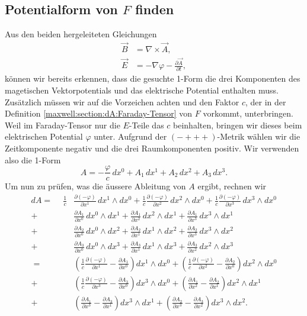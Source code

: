 \subsection{Potentialform von $F$ finden}
Aus den beiden hergeleiteten Gleichungen
\begin{align*}
	\vec{B} &= \nabla \times \vec{A},\\
	\vec{E} &= -\nabla \varphi -\frac{\partial \vec{A}}{\partial t},
\end{align*}
können wir bereits erkennen, dass die gesuchte 1-Form die drei Komponenten des magetischen Vektorpotentials und das elektrische Potential enthalten muss.
Zusätzlich müssen wir auf die Vorzeichen achten und den Faktor $c$, der in der Definition \eqref{maxwell:section:dA:Faraday-Tensor} von $F$ vorkommt, unterbringen.
Weil im Faraday-Tensor nur die $E$-Teile das $c$ beinhalten, bringen wir dieses beim elektrischen Potential $\varphi$ unter.
Aufgrund der $({-}{+}{+}{+})$-Metrik wählen wir die Zeitkomponente negativ und die drei Raumkomponenten positiv.
Wir verwenden also die 1-Form 
\begin{equation}
	A = -\frac{\varphi}{c}\,dx^0 + A_1 \,dx^1 + A_2 \,dx^2 + A_3 \,dx^3.
\end{equation}
Um nun zu prüfen, was die äussere Ableitung von $A$ ergibt, rechnen wir
\begin{align*}
	dA = \phantom{+}
	 \frac{1}{c} &\frac{\partial (-\varphi)}{\partial x^1} \,dx^1 \wedge dx^0
	+ \frac{1}{c}\frac{\partial (-\varphi)}{\partial x^2} \,dx^2 \wedge dx^0
	+ \frac{1}{c}\frac{\partial (-\varphi)}{\partial x^3} \,dx^3 \wedge dx^0
	\\
	+ \phantom{\frac{1}{c}} &\frac{\partial A_1}{\partial x^0} \,dx^0 \wedge dx^1
	+ \frac{\partial A_1}{\partial x^2} \,dx^2 \wedge dx^1
	+ \frac{\partial A_1}{\partial x^3} \,dx^3 \wedge dx^1
	\\
	+ \phantom{\frac{1}{c}} &\frac{\partial A_2}{\partial x^0} \,dx^0 \wedge dx^2
	+ \frac{\partial A_2}{\partial x^1} \,dx^1 \wedge dx^2
	+ \frac{\partial A_2}{\partial x^3} \,dx^3 \wedge dx^2
	\\
	+ \phantom{\frac{1}{c}} &\frac{\partial A_3}{\partial x^0} \,dx^0 \wedge dx^3
	+ \frac{\partial A_3}{\partial x^1} \,dx^1 \wedge dx^3
	+ \frac{\partial A_3}{\partial x^2} \,dx^2 \wedge dx^3
	\\[2ex] 
	=
	\phantom{+} & \left(\frac{1}{c}\frac{\partial (-\varphi)}{\partial x^1}-\frac{\partial A_1}{\partial x^0}\right) dx^1 \wedge dx^0 
	+ \left(\frac{1}{c}\frac{\partial (-\varphi)}{\partial x^2}-\frac{\partial A_2}{\partial x^0}\right) dx^2 \wedge dx^0
	\\
	+ &\left(\frac{1}{c}\frac{\partial (-\varphi)}{\partial x^3}-\frac{\partial A_3}{\partial x^0}\right) dx^3 \wedge dx^0
	+ \left(\frac{\partial A_1}{\partial x^2}-\frac{\partial A_2}{\partial x^1}\right) dx^2 \wedge dx^1
	\\
	+ & \left(\frac{\partial A_1}{\partial x^3}-\frac{\partial A_3}{\partial x^1}\right) dx^3 \wedge dx^1 
	+ \left(\frac{\partial A_2}{\partial x^3}-\frac{\partial A_3}{\partial x^2}\right) dx^3 \wedge dx^2.				
\end{align*}
